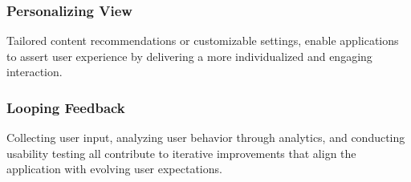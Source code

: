 \subsubsection{Personalizing View}

Tailored content recommendations or customizable settings, enable applications to assert user experience by delivering 
a more individualized and engaging interaction.


\subsubsection{Looping Feedback} 

Collecting user input, analyzing user behavior through analytics, and conducting usability testing all contribute to 
iterative improvements that align the application with evolving user expectations.
